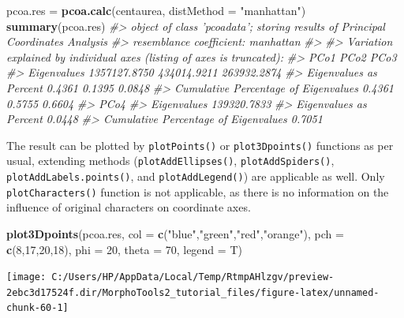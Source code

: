 \documentclass[
]{article}
\newenvironment{Shaded}{\begin{snugshade}}{\end{snugshade}}
\newcommand{\CommentTok}[1]{\textcolor[rgb]{0.56,0.35,0.01}{\textit{#1}}}
\newcommand{\DataTypeTok}[1]{\textcolor[rgb]{0.13,0.29,0.53}{#1}}
\newcommand{\DecValTok}[1]{\textcolor[rgb]{0.00,0.00,0.81}{#1}}
\newcommand{\KeywordTok}[1]{\textcolor[rgb]{0.13,0.29,0.53}{\textbf{#1}}}
\newcommand{\NormalTok}[1]{#1}
\newcommand{\StringTok}[1]{\textcolor[rgb]{0.31,0.60,0.02}{#1}}
\begin{document}
\begin{Shaded}
\begin{Highlighting}[]
\NormalTok{pcoa.res =}\StringTok{ }\KeywordTok{pcoa.calc}\NormalTok{(centaurea, }\DataTypeTok{distMethod =} \StringTok{"manhattan"}\NormalTok{)}
\KeywordTok{summary}\NormalTok{(pcoa.res)}
\CommentTok{#> object of class 'pcoadata'; storing results of Principal Coordinates Analysis}
\CommentTok{#> resemblance coefficient:  manhattan }
\CommentTok{#> }
\CommentTok{#> Variation explained by individual axes (listing of axes is truncated):}
\CommentTok{#>                                              PCo1        PCo2        PCo3}
\CommentTok{#> Eigenvalues                          1357127.8750 434014.9211 263932.2874}
\CommentTok{#> Eigenvalues as Percent                     0.4361      0.1395      0.0848}
\CommentTok{#> Cumulative Percentage of Eigenvalues       0.4361      0.5755      0.6604}
\CommentTok{#>                                             PCo4}
\CommentTok{#> Eigenvalues                          139320.7833}
\CommentTok{#> Eigenvalues as Percent                    0.0448}
\CommentTok{#> Cumulative Percentage of Eigenvalues      0.7051}
\end{Highlighting}
\end{Shaded}

The result can be plotted by \texttt{plotPoints()} or
\texttt{plot3Dpoints()} functions as per usual, extending methods
(\texttt{plotAddEllipses()}, \texttt{plotAddSpiders()},
\texttt{plotAddLabels.points()}, and \texttt{plotAddLegend()}) are
applicable as well. Only \texttt{plotCharacters()} function is not
applicable, as there is no information on the influence of original
characters on coordinate axes.

\begin{Shaded}
\begin{Highlighting}[]
\KeywordTok{plot3Dpoints}\NormalTok{(pcoa.res, }\DataTypeTok{col =} \KeywordTok{c}\NormalTok{(}\StringTok{"blue"}\NormalTok{,}\StringTok{"green"}\NormalTok{,}\StringTok{"red"}\NormalTok{,}\StringTok{"orange"}\NormalTok{), }\DataTypeTok{pch =} \KeywordTok{c}\NormalTok{(}\DecValTok{8}\NormalTok{,}\DecValTok{17}\NormalTok{,}\DecValTok{20}\NormalTok{,}\DecValTok{18}\NormalTok{), }
             \DataTypeTok{phi =} \DecValTok{20}\NormalTok{, }\DataTypeTok{theta =} \DecValTok{70}\NormalTok{, }\DataTypeTok{legend =}\NormalTok{ T)}
\end{Highlighting}
\end{Shaded}

\begin{center}\texttt{[image: C:/Users/HP/AppData/Local/Temp/RtmpAHlzgv/preview-2ebc3d17524f.dir/MorphoTools2\_tutorial\_files/figure-latex/unnamed-chunk-60-1]} \end{center}
\end{document}

